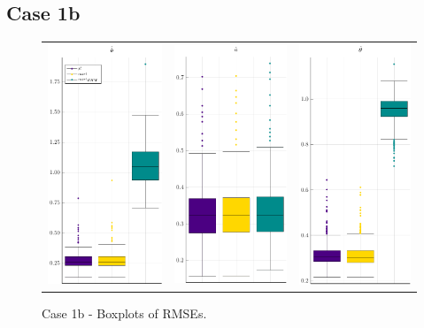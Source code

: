\subsection{Case 1b}
\begin{figure}[ht]
			\centering \begin{tabular}[b]{c c c}
		\includegraphics[width=.3\textwidth]{Figures/1b/RMSE_b.pdf} & \includegraphics[width=.3\textwidth]{Figures/1b/RMSE_a.pdf} & \includegraphics[width=.3\textwidth]{Figures/1b/RMSE_t.pdf}
	\end{tabular}
\caption{Case 1b - Boxplots of RMSEs.}
	\label{fig:bpRMSE1b}
\end{figure}
